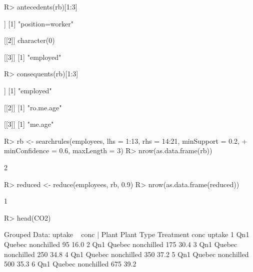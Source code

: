 \documentclass{article}\usepackage[]{graphicx}\usepackage[]{color}
\begin{document}
\begin{Schunk}
% --begin: "searchrules4"
\begin{Sinput}
R> antecedents(rb)[1:3]
\end{Sinput}
\begin{Soutput}
[[1]]
[1] "position=worker"

[[2]]
character(0)

[[3]]
[1] "employed"
\end{Soutput}
\begin{Sinput}
R> consequents(rb)[1:3]
\end{Sinput}
\begin{Soutput}
[[1]]
[1] "employed"

[[2]]
[1] "ro.me.age"

[[3]]
[1] "me.age"
\end{Soutput}
%
% --end: "searchrules4"
\end{Schunk}

\begin{Schunk}
% --begin: "reduce"
\begin{Sinput}
R> rb <- searchrules(employees, lhs = 1:13, rhs = 14:21, minSupport = 0.2, 
+      minConfidence = 0.6, maxLength = 3)
R> nrow(as.data.frame(rb))
\end{Sinput}
\begin{Soutput}
[1] 2
\end{Soutput}
\begin{Sinput}
R> reduced <- reduce(employees, rb, 0.9)
R> nrow(as.data.frame(reduced))
\end{Sinput}
\begin{Soutput}
[1] 1
\end{Soutput}
%
% --end: "reduce"
\end{Schunk}

\begin{Schunk}
% --begin: "pbld1"
\begin{Sinput}
R> head(CO2)
\end{Sinput}
\begin{Soutput}
Grouped Data: uptake ~ conc | Plant
  Plant   Type  Treatment conc uptake
1   Qn1 Quebec nonchilled   95   16.0
2   Qn1 Quebec nonchilled  175   30.4
3   Qn1 Quebec nonchilled  250   34.8
4   Qn1 Quebec nonchilled  350   37.2
5   Qn1 Quebec nonchilled  500   35.3
6   Qn1 Quebec nonchilled  675   39.2
\end{Soutput}
%
% --end: "pbld1"
\end{Schunk}
\end{document}
